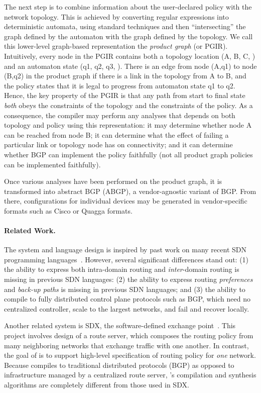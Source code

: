 The next step is to combine information about
the user-declared policy with the network topology.
This is achieved by converting regular expressions into deterministic
automata, using standard techniques and then ``intersecting'' the graph
defined by the automaton with the graph defined by the topology.
We call this lower-level graph-based representation the \emph{product graph} (or PGIR).
Intuitively, every node in the PGIR contains both a topology location
(A, B, C, \etc) and an automaton state (q1, q2, q3, \etc).  There is an
edge from node (A,q1) to node (B,q2) in the product graph if there is
a link in the topology from A to B, and the \Propane policy states that
it is legal to progress from automaton state q1 to q2.  Hence,
the key property of the PGIR is that any path from start to final state
\emph{both} obeys the constraints of the topology and the constraints
of the policy.  As a consequence, the compiler may perform any
analyses that depends on both topology and policy using this representation:  
it may determine whether node A can be reached from node B; it can determine
what the effect of failing a particular link or topology node has on 
connectivity; and it can determine whether BGP can implement the policy
faithfully (not all product graph policies can be implemented faithfully).

Once various analyses have been performed on the product graph, it is
transformed into abstract BGP (ABGP), a vendor-agnostic variant of BGP.
From there, configurations for individual devices may be generated in
vendor-specific formats such as Cisco or Quagga formats.

\paragraph*{Related Work.}
The \Propane system and language design is inspired by past work on many 
recent SDN programming
languages~\cite{frenetic,pyretic,flowlog,foster:merlin,netkat,kinetic,pga}.
However, several significant differences stand out:  (1) the ability to express
both intra-domain routing and \emph{inter}-domain routing is missing in
previous SDN languages: 
(2) the ability to express routing \emph{preferences} and 
\emph{back-up paths} is missing in
previous SDN languages;
and (3) the ability to compile to fully distributed control plane
protocols such as BGP, which need no centralized controller,
scale to the largest networks, and fail and recover locally.

Another related system is SDX, the software-defined exchange 
point~\cite{sdx,isdx}. This project involves design of a route server, which 
composes the routing policy from
many neighboring networks that exchange traffic
with one another.
In contrast, the goal of \Propane is to support high-level 
specification of routing policy for \emph{one}
network.  Because
\Propane compiles to traditional distributed protocols (BGP) as opposed
to infrastructure managed by a centralized route server, 
\Propane's compilation and synthesis algorithms
are completely different from those used in SDX.

